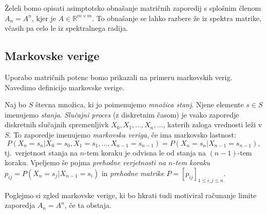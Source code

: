 \documentclass[mat1]{fmfdelo}
\newcommand{\R}{\mathbb R}
\begin{document}
Želeli bomo opisati asimptotsko obnašanje matričnih zaporedij s splošnim členom $A_n = A^n$, kjer je $A \in \R^{m \times m}$. To obnašanje se lahko razbere že iz spektra matrike, včasih pa celo le iz spektralnega radija.

\subsection{Markovske verige}\label{podpoglavjeMarkovskeVerige}

Uporabo matričnih potenc bomo prikazali na primeru markovskih verig. Navedimo definicijo markovske verige.
\begin{definicija}
    Naj bo $S$ števna množica, ki jo poimenujemo \emph{množica stanj}. Njene elemente $s \in S$ imenujemo \emph{stanja}. \emph{Slučajni proces} (z diskretnim časom) je vsako zaporedje diskretnih slučajnih spremenljivk $X_0, X_1, \ldots, X_n, \ldots$, katerih zaloga vrednosti leži v $S$. To zaporedje imenujemo \emph{markovska veriga}, če ima markovsko lastnost:
    \begin{equation*}
        P(X_n = s_n | X_0 = s_0, X_1 = s_1, \ldots, X_{n-1} = s_{n-1}) = P(X_n = s_n | X_{n-1} = s_{n-1}),
    \end{equation*}
    tj.\ verjetnost stanja na $n$-tem koraku je odvisna le od stanja na $(n-1)$-tem koraku. Vpeljemo še pojma \emph{prehodne verjetnosti na $n$-tem koraku} $p_{ij} = P(X_n = s_j | X_{n-1} = s_i)$ in \emph{prehodne matrike} $P = [p_{ij}]_{1 \leq i,j \leq n}$.
\end{definicija}
Poglejmo si zgled markovske verige, ki bo hkrati tudi motiviral računanje limite zaporedja $A_n = A^n$, če ta obstaja. 
\end{document}

